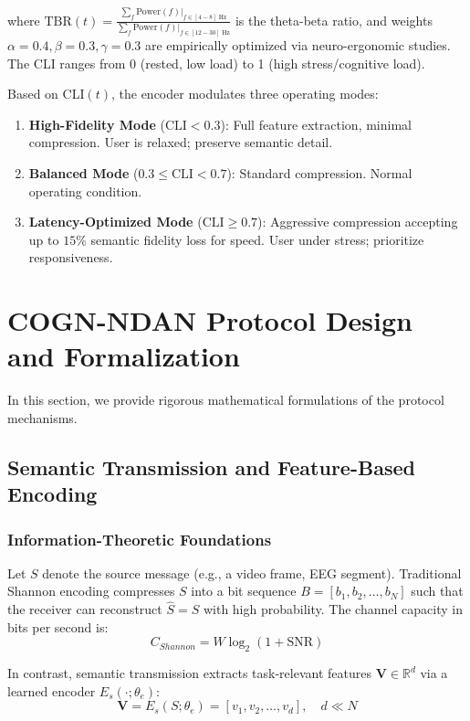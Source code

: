 \documentclass[journal]{IEEEtran}
\begin{document}
where $\text{TBR}(t) = \frac{\sum_f \text{Power}(f) |_{f \in [4-8] \text{ Hz}}}{\sum_f \text{Power}(f) |_{f \in [12-30] \text{ Hz}}}$ is the theta-beta ratio, and weights $\alpha=0.4, \beta=0.3, \gamma=0.3$ are empirically optimized via neuro-ergonomic studies. The CLI ranges from 0 (rested, low load) to 1 (high stress/cognitive load).

Based on CLI$(t)$, the encoder modulates three operating modes:
\begin{enumerate}
    \item \textbf{High-Fidelity Mode} ($\text{CLI} < 0.3$): Full feature extraction, minimal compression. User is relaxed; preserve semantic detail.
    \item \textbf{Balanced Mode} ($0.3 \leq \text{CLI} < 0.7$): Standard compression. Normal operating condition.
    \item \textbf{Latency-Optimized Mode} ($\text{CLI} \geq 0.7$): Aggressive compression accepting up to $15\%$ semantic fidelity loss for speed. User under stress; prioritize responsiveness.
\end{enumerate}

\section{COGN-NDAN Protocol Design and Formalization}

In this section, we provide rigorous mathematical formulations of the protocol mechanisms.

\subsection{Semantic Transmission and Feature-Based Encoding}

\subsubsection{Information-Theoretic Foundations}
Let $S$ denote the source message (e.g., a video frame, EEG segment). Traditional Shannon encoding compresses $S$ into a bit sequence $B = [b_1, b_2, \ldots, b_N]$ such that the receiver can reconstruct $\hat{S} = S$ with high probability. The channel capacity in bits per second is:
\begin{equation}
    C_{Shannon} = W \log_2(1 + \text{SNR})
\end{equation}

In contrast, semantic transmission extracts task-relevant features $\mathbf{V} \in \mathbb{R}^d$ via a learned encoder $E_s(\cdot; \theta_e)$:
\begin{equation}
    \mathbf{V} = E_s(S; \theta_e) = [v_1, v_2, \ldots, v_d], \quad d \ll N
\end{equation}
\end{document}
